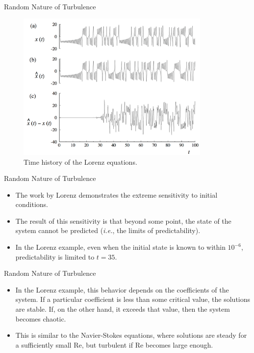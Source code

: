 
\begin{frame}{Random Nature of Turbulence}
  \begin{figure}[H]
  \centering
  \includegraphics[width=0.85\textwidth]{lorenz.png}
  \caption{Time history of the Lorenz equations.}
  \end{figure}
\end{frame}


\begin{frame}{Random Nature of Turbulence}
  \begin{itemize}
  	\item The work by Lorenz demonstrates the extreme sensitivity to initial conditions.
  	\item The result of this sensitivity is that beyond some point, the state of the system cannot be predicted (\textit{i.e.}, the limits of predictability).
  	\item In the Lorenz example, even when the initial state is known to within $10^{-6}$, predictability is limited to $t = 35$.
  \end{itemize}
\end{frame}


\begin{frame}{Random Nature of Turbulence}
  \begin{itemize}
  	\item In the Lorenz example, this behavior depends on the coefficients of the system. If a particular coefficient is less than some critical value, the solutions are stable. If, on the other hand, it exceeds that value, then the system becomes chaotic.
  	\item This is similar to the Navier-Stokes equations, where solutions are steady for a sufficiently small Re, but turbulent if Re becomes large enough.
  \end{itemize}
\end{frame}

